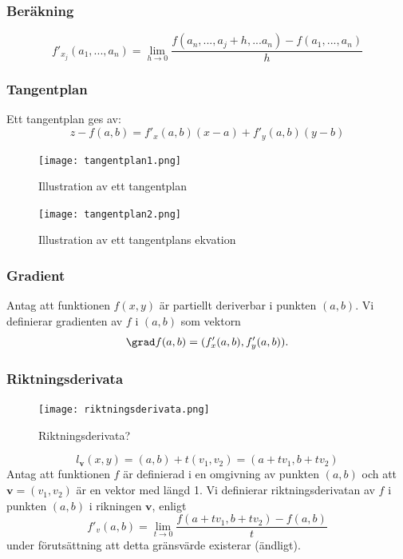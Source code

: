 \documentclass[a4paper,12pt]{article}
\begin{document}
\subsubsection*{Beräkning}
\[
    f'_{x_j} (a_1, ..., a_n) = \lim_{h \to 0} \frac{f(a_n, ..., a_j + h, ... a_n) - f(a_1, ..., a_n)}{h}
\]

\subsubsection*{Tangentplan}
Ett tangentplan ges av:
\[
    z - f(a, b) = f'_x(a, b)(x-a) + f'_y(a, b)(y-b)
\]
\begin{figure}[H]
  \centering
  \texttt{[image: tangentplan1.png]}
  \caption{Illustration av ett tangentplan}
\end{figure}

\begin{figure}[H]
  \centering
  \texttt{[image: tangentplan2.png]}
  \caption{Illustration av ett tangentplans ekvation}
\end{figure}

\subsubsection*{Gradient}
Antag att funktionen $f(x, y)$ är partiellt deriverbar i punkten $(a, b)$. Vi definierar gradienten av $f$ i $(a, b)$ som vektorn
\[
    \grad f(a, b) = (f'_x(a, b), f'_y(a, b)).
\]

\subsubsection*{Riktningsderivata}
\begin{figure}[H]
  \centering
  \texttt{[image: riktningsderivata.png]}
  \caption{Riktningsderivata?}
\end{figure}
\[
    l_\textbf{v}(x, y) = (a, b) + t(v_1, v_2) = (a + tv_1, b + tv_2)
\]
Antag att funktionen $f$ är definierad i en omgivning av punkten $(a, b)$ och att $\textbf{v} = (v_1, v_2)$ är en vektor med längd 1. 
Vi definierar riktningsderivatan av $f$ i punkten $(a, b)$ i rikningen $\textbf{v}$, enligt
\[
    f'_v(a, b) = \lim_{t \to 0} \frac{f(a + tv_1, b+tv_2) - f(a, b)}{t}
\]
under förutsättning att detta gränsvärde existerar (ändligt).
\end{document}
